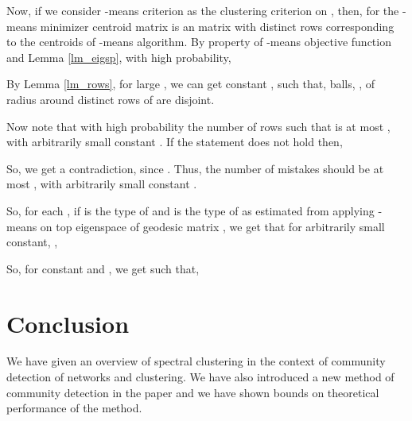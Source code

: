 \documentclass[graybox]{svmult}
\begin{document}
Now, if we consider -means criterion as the clustering criterion on , then, for the -means minimizer centroid matrix  is an  matrix with  distinct rows corresponding to the  centroids of -means algorithm. By property of -means objective function and Lemma \ref{lm_eigsp}, with high probability,


By Lemma \ref{lm_rows}, for large , we can get constant , such that,  balls, , of radius  around  distinct rows of  are disjoint.

Now note that with high probability the number of rows  such that  is at most , with arbitrarily small constant . If the statement does not hold then,

So, we get a contradiction, since . Thus, the number of mistakes should be at most , with arbitrarily small constant . 

So, for each , if  is the type of  and  is the type of  as estimated from applying -means on top  eigenspace of geodesic matrix , we get that for arbitrarily small constant, , 

So, for constant  and , we get  such that, 



\section{Conclusion}
\label{conclusion}
We have given an overview of spectral clustering in the context of community detection of networks and clustering. We have also introduced a new method of community detection in the paper and we have shown bounds on theoretical performance of the method. 






\end{document}
